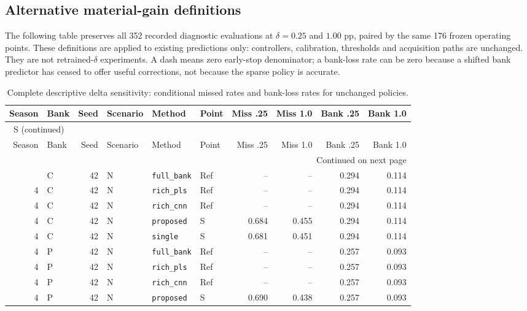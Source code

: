 \documentclass[10pt,a4paper]{article}
\renewcommand{\thetable}{S\arabic{table}}
\begin{document}
\subsection{Alternative material-gain definitions}
The following table preserves all 352 recorded diagnostic evaluations at $\delta=0.25$ and $1.00$ pp, paired by the same 176 frozen operating points. These definitions are applied to existing predictions only: controllers, calibration, thresholds and acquisition paths are unchanged. They are not retrained-$\delta$ experiments. A dash means zero early-stop denominator; a bank-loss rate can be zero because a shifted bank predictor has ceased to offer useful corrections, not because the sparse policy is accurate.

\begingroup\footnotesize
\setlength{\tabcolsep}{3.5pt}
\renewcommand{\arraystretch}{1.10}
\begin{longtable}{rlrlllrrrr}
\caption{Complete descriptive delta sensitivity: conditional missed rates and bank-loss rates for unchanged policies.}\label{tab:delta}\\
\toprule
Season & Bank & Seed & Scenario & Method & Point & Miss .25 & Miss 1.0 & Bank .25 & Bank 1.0 \\
\midrule
\endfirsthead
\multicolumn{10}{l}{\tablename~\thetable{} (continued)}\\
\toprule
Season & Bank & Seed & Scenario & Method & Point & Miss .25 & Miss 1.0 & Bank .25 & Bank 1.0 \\
\midrule
\endhead
\midrule
\multicolumn{10}{r}{Continued on next page}\\
\endfoot
\bottomrule
\endlastfoot
4 & C & 42 & N & \texttt{full\_bank} & Ref & -- & -- & 0.294 & 0.114 \\
4 & C & 42 & N & \texttt{rich\_pls} & Ref & -- & -- & 0.294 & 0.114 \\
4 & C & 42 & N & \texttt{rich\_cnn} & Ref & -- & -- & 0.294 & 0.114 \\
4 & C & 42 & N & \texttt{proposed} & S & 0.684 & 0.455 & 0.294 & 0.114 \\
4 & C & 42 & N & \texttt{single} & S & 0.681 & 0.451 & 0.294 & 0.114 \\
4 & P & 42 & N & \texttt{full\_bank} & Ref & -- & -- & 0.257 & 0.093 \\
4 & P & 42 & N & \texttt{rich\_pls} & Ref & -- & -- & 0.257 & 0.093 \\
4 & P & 42 & N & \texttt{rich\_cnn} & Ref & -- & -- & 0.257 & 0.093 \\
4 & P & 42 & N & \texttt{proposed} & S & 0.690 & 0.438 & 0.257 & 0.093 \\

\end{longtable}
\end{document}
